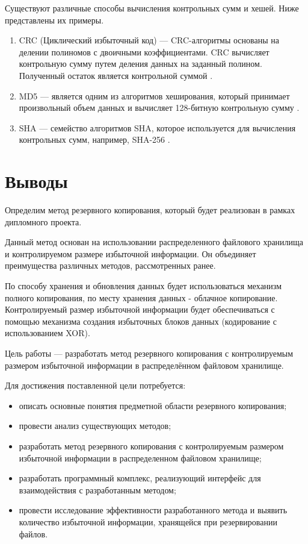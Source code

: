 Существуют различные способы вычисления контрольных сумм и хешей. Ниже представлены их примеры.
\begin{enumerate}
\item CRC (Циклический избыточный код) --- CRC-алгоритмы основаны на делении полиномов с двоичными коэффициентами. CRC вычисляет контрольную сумму путем деления данных на заданный полином. Полученный остаток является контрольной суммой \cite{crc}.
\item MD5 --- является одним из алгоритмов хеширования, который принимает произвольный объем данных и вычисляет 128-битную контрольную сумму \cite{md5}.
\item SHA --- семейство алгоритмов SHA, которое используется для вычисления контрольных сумм, например, SHA-256 \cite{sha256}.
\end{enumerate}

\newpage
\section{Выводы}

Определим метод резервного копирования, который будет реализован в рамках дипломного проекта. 

Данный метод основан на использовании распределенного файлового хранилища и контролируемом размере избыточной информации. Он объединяет преимущества различных методов, рассмотренных ранее.  

По способу хранения и обновления данных будет использоваться механизм полного копирования, по месту хранения данных - облачное копирование. Контролируемый размер избыточной информации будет обеспечиваться с помощью  механизма создания избыточных блоков данных (кодирование с использованием XOR).  

Цель работы --- разработать метод резервного копирования с контролируемым размером избыточной информации в распределённом файловом хранилище.

\begin{flushleft}
Для достижения поставленной цели потребуется:
\end{flushleft}
\begin{itemize}
\item описать основные понятия предметной области резервного копирования;
\item провести анализ существующих методов;
\item разработать метод резервного копирования с контролируемым размером избыточной информации в распределенном файловом хранилище;
\item разработать программный комплекс, реализующий интерфейс для взаимодействия с разработанным методом;
\item провести исследование эффективности разработанного метода и выявить количество избыточной информации, хранящейся при резервировании файлов.
\end{itemize}